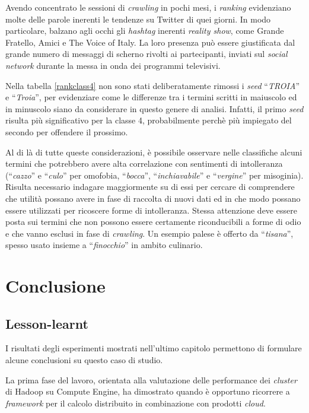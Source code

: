Avendo concentrato le sessioni di \textit{crawling} in pochi mesi, i \textit{ranking} evidenziano molte delle parole inerenti le tendenze su Twitter di quei giorni.
In modo particolare, balzano agli occhi gli \textit{hashtag} inerenti \textit{reality show}, come Grande Fratello, Amici e The Voice of Italy. La loro presenza può essere giustificata dal grande numero di messaggi
di scherno rivolti ai partecipanti, inviati sul \textit{social network} durante la messa in onda dei programmi televisivi.

Nella tabella \ref{rankclass4} non sono stati deliberatamente rimossi i \textit{seed} ``\textit{TROIA}'' e ``\textit{Troia}'', per evidenziare come le differenze tra i termini scritti in maiuscolo ed in minuscolo
siano da considerare in questo genere di analisi. Infatti, il primo \textit{seed} risulta più significativo per la classe 4, probabilmente perchè più impiegato del secondo per offendere il prossimo.

Al di là di tutte queste considerazioni, è possibile osservare nelle classifiche alcuni termini che potrebbero avere alta correlazione con sentimenti di intolleranza (``\textit{cazzo}'' e ``\textit{culo}'' per omofobia, 
``\textit{bocca}'', ``\textit{inchiavabile}'' e ``\textit{vergine}'' per misoginia). Risulta necessario indagare maggiormente su di essi per cercare di comprendere che utilità possano avere in fase di raccolta di nuovi dati ed
in che modo possano essere utilizzati per ricoscere forme di intolleranza.
Stessa attenzione deve essere posta sui termini che non possono essere certamente riconducibili a forme di odio e che vanno esclusi in fase di \textit{crawling}. Un esempio palese è offerto da ``\textit{tisana}'', spesso usato
insieme a ``\textit{finocchio}'' in ambito culinario.

\part{Conclusione}

\chapter*{Lesson-learnt}

I risultati degli esperimenti mostrati nell'ultimo capitolo permettono di formulare alcune conclusioni su questo caso di studio.

La prima fase del lavoro, orientata alla valutazione delle performance dei \textit{cluster} di Hadoop su Compute Engine, ha dimostrato quando è opportuno ricorrere a 
\textit{framework} per il calcolo distribuito in combinazione con prodotti \textit{cloud}.

